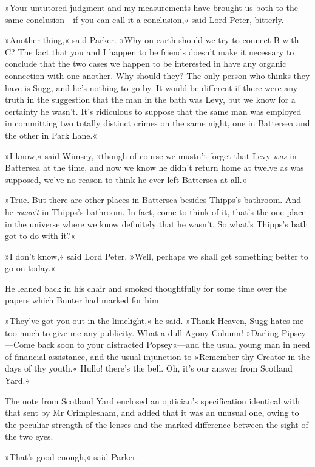 »Your untutored judgment and my measurements have brought us both to the same conclusion—if you can call it a conclusion,« said Lord Peter, bitterly.

»Another thing,« said Parker. »Why on earth should we try to connect \textsc{B} with \textsc{C}? The fact that you and I happen to be friends doesn't make it necessary to conclude that the two cases we happen to be interested in have any organic connection with one another. Why should they? The only person who thinks they have is Sugg, and he's nothing to go by. It would be different if there were any truth in the suggestion that the man in the bath was Levy, but we know for a certainty he wasn't. It's ridiculous to suppose that the same man was employed in committing two totally distinct crimes on the same night, one in Battersea and the other in Park Lane.«

»I know,« said Wimsey, »though of course we mustn't forget that Levy \textit{was} in Battersea at the time, and now we know he didn't return home at twelve as was supposed, we've no reason to think he ever left Battersea at all.«

»True. But there are other places in Battersea besides Thipps's bathroom. And he \textit{wasn't} in Thipps's bathroom. In fact, come to think of it, that's the one place in the universe where we know definitely that he wasn't. So what's Thipps's bath got to do with it?«

»I don't know,« said Lord Peter. »Well, perhaps we shall get something better to go on today.«

He leaned back in his chair and smoked thoughtfully for some time over the papers which Bunter had marked for him.

»They've got you out in the limelight,« he said. »Thank Heaven, Sugg hates me too much to give me any publicity. What a dull Agony Column! »Darling Pipsey—Come back soon to your distracted Popsey«---and the usual young man in need of financial assistance, and the usual injunction to »Remember thy Creator in the days of thy youth.« Hullo! there's the bell. Oh, it's our answer from Scotland Yard.«

The note from Scotland Yard enclosed an optician's specification identical with that sent by Mr Crimplesham, and added that it was an unusual one, owing to the peculiar strength of the lenses and the marked difference between the sight of the two eyes.

»That's good enough,« said Parker.


